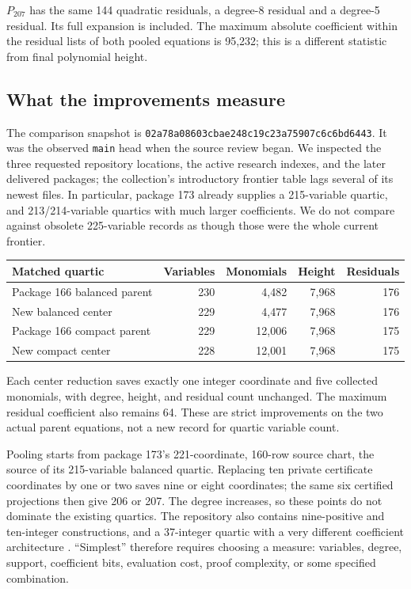 \documentclass[10pt,letterpaper]{article}
\theoremstyle{definition}\newtheorem{definition}[theorem]{Definition}
\theoremstyle{remark}\newtheorem{remark}[theorem]{Remark}
\newcommand{\pin}{\texttt{02a78a08603cbae248c19c23a75907c6c6bd6443}}
\begin{document}
$P_{207}$ has the same 144 quadratic residuals, a degree-8 residual and a
degree-5 residual. Its full expansion is included. The maximum absolute
coefficient within the residual lists of both pooled equations is
95,232; this is a different statistic from final polynomial height.

\subsection{What the improvements measure}

The comparison snapshot is \pin. It was the observed \texttt{main} head
when the source review began. We inspected the three requested repository
locations, the active research indexes, and the later delivered packages;
the collection's introductory frontier table lags several of its newest
files. In particular, package 173 already supplies a 215-variable
quartic, and 213/214-variable quartics with much larger coefficients.
We do not compare against obsolete 225-variable records as though those
were the whole current frontier.

\begin{center}\small
\begin{tabular}{@{}lrrrr@{}}
\toprule
Matched quartic & Variables & Monomials & Height & Residuals\\
\midrule
Package 166 balanced parent &230&4,482&7,968&176\\
New balanced center &229&4,477&7,968&176\\
Package 166 compact parent &229&12,006&7,968&175\\
New compact center &228&12,001&7,968&175\\
\bottomrule
\end{tabular}
\end{center}
Each center reduction saves exactly one integer coordinate and five
collected monomials, with degree, height, and residual count unchanged.
The maximum residual coefficient also remains 64. These are strict
improvements on the two actual parent equations, not a new record for
quartic variable count.

Pooling starts from package 173's 221-coordinate, 160-row source chart,
the source of its 215-variable balanced quartic. Replacing ten private
certificate coordinates by one or two saves nine or eight coordinates;
the same six certified projections then give 206 or 207. The degree
increases, so these points do not dominate the existing quartics. The
repository also contains nine-positive and ten-integer constructions,
and a 37-integer quartic with a very different coefficient architecture
\cite{collection,sun}. ``Simplest'' therefore requires choosing a
measure: variables, degree, support, coefficient bits, evaluation cost,
proof complexity, or some specified combination.
\end{document}
